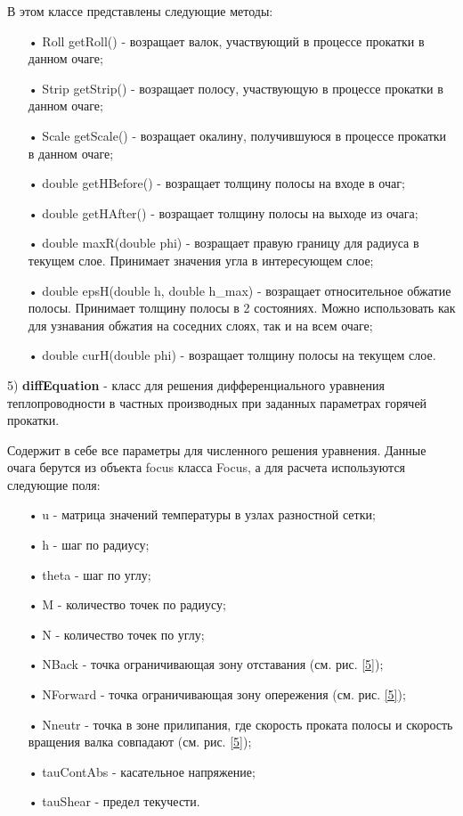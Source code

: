 В этом классе представлены следующие методы:
\begin{itemize}
\item[•] Roll getRoll() - возращает валок, участвующий в процессе прокатки в данном очаге;
\item[•] Strip getStrip() - возращает полосу, участвующую в процессе прокатки в данном очаге;
\item[•] Scale getScale() - возращает окалину, получившуюся в процессе прокатки в данном очаге;
\item[•] double getHBefore() - возращает толщину полосы на входе в очаг;
\item[•] double getHAfter() - возращает толщину полосы на выходе из очага;
\item[•] double maxR(double phi) - возращает правую границу для радиуса в текущем слое. Принимает значения угла в интересующем слое;
\item[•] double epsH(double h, double h\_max) - возращает относительное обжатие полосы. Принимает толщину полосы в 2 состояниях. Можно использовать как для узнавания обжатия на соседних слоях, так и на всем очаге;
\item[•] double curH(double phi) - возращает толщину полосы на текущем слое.
\end{itemize}

5) \textbf{diffEquation} - класс для решения дифференциального уравнения теплопроводности в частных производных при заданных параметрах горячей прокатки.

Содержит в себе все параметры для численного решения уравнения. Данные очага берутся из объекта focus класса Focus, а для расчета используются следующие поля:
\begin{itemize}
\item[•] u - матрица значений температуры в узлах разностной сетки;
\item[•] h - шаг по радиусу;
\item[•] theta - шаг по углу;
\item[•] M - количество точек по радиусу;
\item[•] N - количество точек по углу;
\item[•] NBack - точка ограничивающая зону отставания (см. рис. \ref{5});
\item[•] NForward - точка ограничивающая зону опережения (см. рис. \ref{5});
\item[•] Nneutr - точка в зоне прилипания, где скорость проката полосы и скорость вращения валка совпадают (см. рис. \ref{5});
\item[•] tauContAbs - касательное напряжение;
\item[•] tauShear - предел текучести.
\end{itemize}

